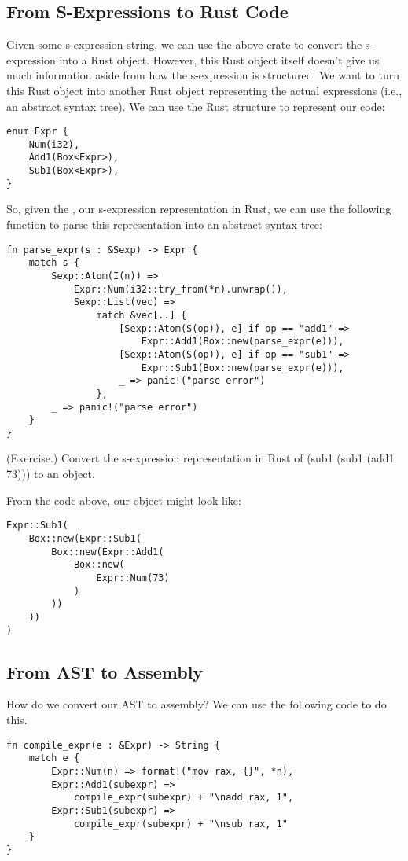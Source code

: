 \documentclass[letterpaper]{article}
\begin{document}
\subsection{From S-Expressions to Rust Code}
Given some s-expression string, we can use the above crate to convert the s-expression into a Rust object. However, this Rust object itself doesn't give us much information aside from how the s-expression is structured. We want to turn this Rust object into another Rust object representing the actual expressions (i.e., an abstract syntax tree). We can use the Rust structure to represent our code: 
\begin{verbatim}
enum Expr {
    Num(i32),
    Add1(Box<Expr>),
    Sub1(Box<Expr>),
}\end{verbatim}
So, given the , our s-expression representation in Rust, we can use the following function to parse this representation into an abstract syntax tree: 
\begin{verbatim}
fn parse_expr(s : &Sexp) -> Expr {
    match s {
        Sexp::Atom(I(n)) =>
            Expr::Num(i32::try_from(*n).unwrap()),
            Sexp::List(vec) =>
                match &vec[..] {
                    [Sexp::Atom(S(op)), e] if op == "add1" =>
                        Expr::Add1(Box::new(parse_expr(e))),
                    [Sexp::Atom(S(op)), e] if op == "sub1" =>
                        Expr::Sub1(Box::new(parse_expr(e))),
                    _ => panic!("parse error")
	            },
        _ => panic!("parse error")
    }
}\end{verbatim}

\begin{mdframed}
    (Exercise.) Convert the s-expression representation in Rust of \code(sub1 (sub1 (add1 73))) to an  object. 

    \begin{mdframed}
        From the code above, our object might look like: 
        \begin{verbatim}
Expr::Sub1(
    Box::new(Expr::Sub1(
        Box::new(Expr::Add1(
            Box::new(
                Expr::Num(73)
            )
        ))
    ))
)\end{verbatim}
    \end{mdframed}
\end{mdframed}


\subsection{From AST to Assembly}
How do we convert our AST to assembly? We can use the following code to do this. 
\begin{verbatim}
fn compile_expr(e : &Expr) -> String {
    match e {
    	Expr::Num(n) => format!("mov rax, {}", *n),
    	Expr::Add1(subexpr) =>
            compile_expr(subexpr) + "\nadd rax, 1",
    	Expr::Sub1(subexpr) =>
            compile_expr(subexpr) + "\nsub rax, 1"
    }
}
\end{verbatim}
\end{document}
